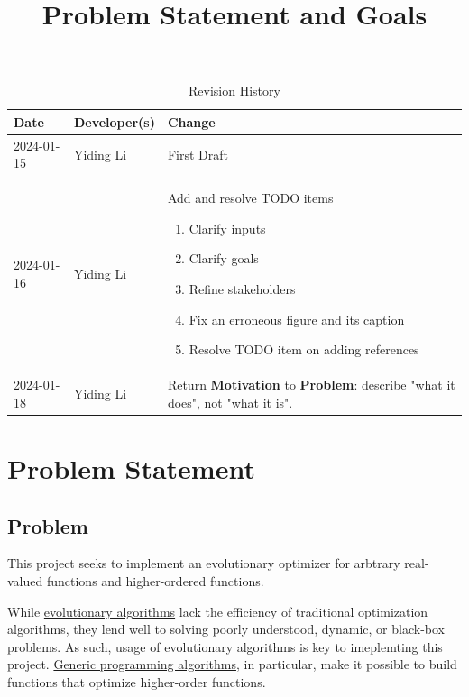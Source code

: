\documentclass{article}
\title{Problem Statement and Goals\\\progname}
\author{\authname}
\date{}
\begin{document}
\maketitle

\begin{table}[hp]
\caption{Revision History} \label{TblRevisionHistory}
\begin{tabularx}{\textwidth}{llX}
\toprule
\textbf{Date} & \textbf{Developer(s)} & \textbf{Change}\\
\midrule
2024-01-15 & Yiding Li & First Draft\\
2024-01-16 & Yiding Li & Add and resolve TODO items
\begin{enumerate}
    \item Clarify inputs
    \item Clarify goals
    \item Refine stakeholders
    \item Fix an erroneous figure and its caption
    \item Resolve TODO item on adding references
\end{enumerate}
\\
2024-01-18 & Yiding Li & Return \textbf{Motivation} to \textbf{Problem}: describe "what it does", not "what it is".\\
\bottomrule
\end{tabularx}
\end{table}

\section{Problem Statement}


\subsection{Problem}

This project seeks to implement an evolutionary optimizer for arbtrary real-valued functions and higher-ordered functions.

While \hyperref[sec:evalg]{evolutionary algorithms} lack the efficiency of traditional optimization algorithms, they lend well to solving poorly understood, dynamic, or black-box problems. As such, usage of evolutionary algorithms is key to imeplemting this project. \hyperref[sec:genalg]{Generic programming algorithms}, in particular, make it possible to build functions that optimize higher-order functions.
\end{document}
